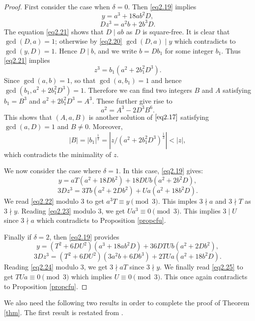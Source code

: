 \documentclass[12pt, 14paper,reqno]{amsart}
\theoremstyle{plain}
\theoremstyle{proof}
\numberwithin{equation}{section}
\begin{document}
\begin{proof}
First consider the case when $\delta=0$. Then \eqref{eq2.19} implies
\begin{equation}\label{eq2.20}
y=a^3+18ab^2D,
\end{equation} 
\begin{equation}\label{eq2.21}
Dz^3=a^2b+2b^3 D.
\end{equation}
The equation \eqref{eq2.21} shows that $D\mid ab$ as $D$ is square-free. It is clear that $\gcd(D,a)=1$; otherwise by \eqref{eq2.20} $\gcd(D,a)\mid y$ which contradicts to $\gcd(y,D)=1$. Hence $D\mid b$, and we write $b=Db_1$ for some integer $b_1$. Thus \eqref{eq2.21} implies 
$$z^3=b_1(a^2+2b_1^2D^3).$$
Since $\gcd(a,b)=1$, so that $\gcd(a, b_1)=1$ and hence $\gcd(b_1, a^2+2b_1^2D^3)=1$. Therefore we can find two integers $B$ and $A$ satisfying $b_1=B^3$ and $a^2+2b_1^2D^3=A^3$. These further give rise to 
$$a^2=A^3-2D^3B^6.$$
This shows that $(A, a, B)$ is another solution of $\eqref{eq2.17}$ satisfying $\gcd(a,D)=1$ and $B\ne 0$. Moreover, 
$$|B|=|b_1|^{\frac{1}{3}}=|z/(a^2+2b_1^2D^3)^{\frac{1}{3}}|<|z|,$$ which contradicts the minimality of $z$. 

We now consider the case where $\delta=1$. In this case, \eqref{eq2.19} gives:
\begin{equation}\label{eq2.22}
y=aT(a^2+18Db^2)+18DUb(a^2+2b^2D), 
\end{equation}
\begin{equation}\label{eq2.23}
3Dz^3=3Tb(a^2+2Db^2)+Ua(a^2+18b^2D). 
\end{equation}
We read \eqref{eq2.22} modulo $3$ to get $a^3T\equiv y\pmod 3$. This imples $3\nmid a$  and $3\nmid T$ as $3\nmid y$. Reading \eqref{eq2.23} modulo $3$, we get 
$Ua^3\equiv 0\pmod 3$. This implies $3\mid U$ since $3\nmid a$ which contradicts to Proposition \ref{propcfu}.

Finally if $\delta=2$, then \eqref{eq2.19} provides 
\begin{equation}\label{eq2.24}
y=(T^2+6DU^2)(a^3+18ab^2D)+36DTUb(a^2+2Db^2),
\end{equation}
\begin{equation}\label{eq2.25}
3Dz^3=(T^2+6DU^2)(3a^2b+6Db^3)+2TUa(a^2+18b^2D).
\end{equation}
Reading \eqref{eq2.24} modulo $3$, we get $3\nmid aT$ since $3\nmid y$. We finally read \eqref{eq2.25} to get $TUa\equiv 0\pmod 3$ which implies $U\equiv 0\pmod 3$. This once again contradicts to Proposition \ref{propcfu}. 
\end{proof}

We also need the following two results in order to complete the proof of Theorem \ref{thm}. The first result is restated from \cite[Ex. 10.19, p. 323]{SI}.
\end{document}
